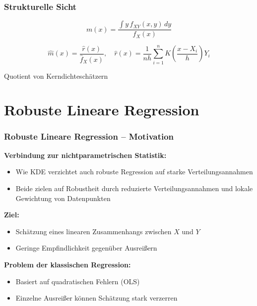 \documentclass{beamer}
\begin{document}
	
	\begin{frame}
		\frametitle{Strukturelle Sicht}
		
		\[
		m(x) = \frac{\int y\, f_{XY}(x,y)\, dy}{f_X(x)}
		\]
		
		\[
		\hat m(x) = \frac{\hat r(x)}{\hat f_X(x)},
		\quad
		\hat r(x) = \frac{1}{nh} \sum_{i=1}^n
		K\left(\frac{x-X_i}{h}\right) Y_i
		\]
		
		\alert{Quotient von Kerndichtesch\"atzern}
	\end{frame}
	
	
	\section{Robuste Lineare Regression}
	
	\begin{frame}
		\frametitle{Robuste Lineare Regression – Motivation}
		
		\textbf{Verbindung zur nichtparametrischen Statistik:}
		\begin{itemize}
			\item Wie KDE verzichtet auch robuste Regression auf starke Verteilungsannahmen
			\item Beide zielen auf Robustheit durch reduzierte Verteilungsannahmen und lokale Gewichtung von Datenpunkten
		\end{itemize}
		
		\vspace{0.5em}
		
		\textbf{Ziel:}
		\begin{itemize}
			\item Schätzung eines linearen Zusammenhangs zwischen $X$ und $Y$
			\item Geringe Empfindlichkeit gegenüber Ausreißern
		\end{itemize}
		
		\vspace{0.5em}
		
		\textbf{Problem der klassischen Regression:}
		\begin{itemize}
			\item Basiert auf quadratischen Fehlern (OLS)
			\item Einzelne Ausreißer können Schätzung stark verzerren
		\end{itemize}
	\end{frame}
	
\end{document}
